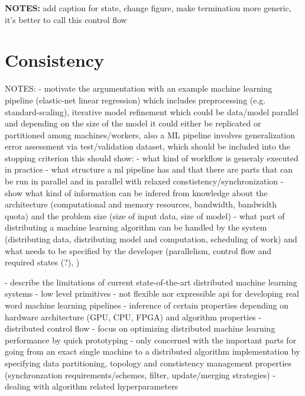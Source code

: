 \textbf{NOTES:} add caption for state, change figure, make termination more generic, it's better to call this control flow


\section{Consistency}

NOTES:
- motivate the argumentation with an example machine learning pipeline (elastic-net linear regression) which includes preprocessing (e.g. standard-scaling), iterative model refinement which could be data/model parallel and depending on the size of the model it could either be replicated or partitioned among machines/workers, also a ML pipeline involves generalization error assessment via test/validation dataset, which should be included into the stopping criterion
this should show:
	- what kind of workflow is generaly executed in practice
	- what structure a ml pipeline has and that there are parts that can be run in parallel and in parallel with relaxed constistency/synchronization
	- show what kind of information can be infered from knowledge about the architecture (computational and memory resources, bandwidth, bandwidth quota) and the problem size (size of input data, size of model)
	- what part of distributing a machine learning algorithm can be handled by the system (distributing data, distributing model and computation, scheduling of work) and what needs to be specified by the developer (parallelism, control flow and required states (?), )

- describe the limitations of current state-of-the-art distributed machine learning systems
	- low level primitives
	- not flexible nor expressible api for developing real word machine learning pipelines
	- inference of certain properties depending on hardware architecture (GPU, CPU, FPGA) and algorithm properties
	- distributed control flow
	- focus on optimizing distributed machine learning performance by quick prototyping
	- only concerned with the important parts for going from an exact single machine to a distributed algorithm implementation by specifying data partitioning, topology and constistency management properties (synchronzation requirements/schemes, filter, update/merging strategies)
	- dealing with algorithm related hyperparameters
